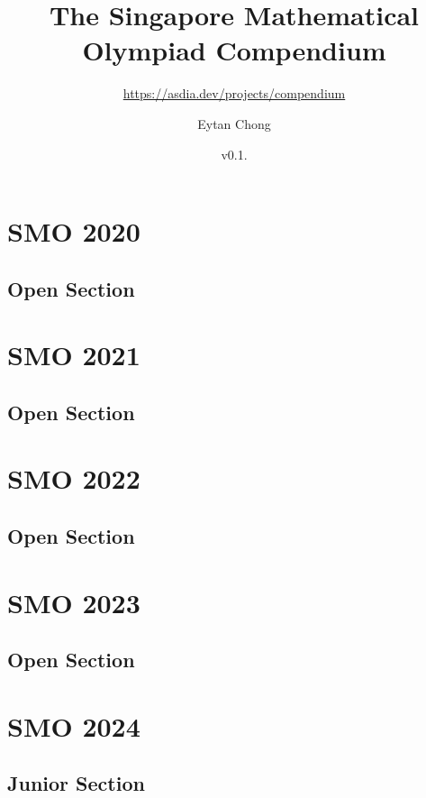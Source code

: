 \documentclass[a4paper,listof=totoc,bibliography=totoc,openany]{scrbook}
\title{The Singapore Mathematical Olympiad Compendium}
\subtitle{\url{https://asdia.dev/projects/compendium}}
\author{Eytan Chong}
\date{v0.1.\datetwo}
\begin{document}
\maketitle

\frontmatter

\tableofcontents



\mainmatter


\chapter{SMO 2020}
\section{Open Section}


\chapter{SMO 2021}
\section{Open Section}


\chapter{SMO 2022}
\section{Open Section}



\chapter{SMO 2023}
\section{Open Section}



\chapter{SMO 2024}
\section{Junior Section}

\end{document}
